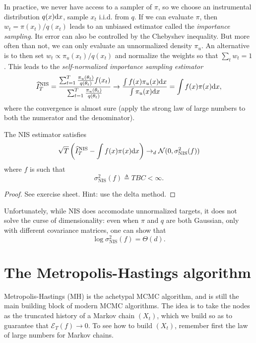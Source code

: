 In practice, we never have access to a sampler of $\pi$, so we choose an instrumental distribution $q(x)\mathrm{d} x$, sample $x_t$ i.i.d. from $q$.
If we can evaluate $\pi$, then $w_t=\pi(x_t)/q(x_t)$ leads to an unbiased estimator called the \emph{importance sampling}.
Its error can also be controlled by the Chebyshev inequality. 
But more often than not, we can only evaluate an unnormalized density $\pi_u$. 
An alternative is to then set $w_t\propto \pi_u(x_t)/q(x_t)$ and normalize the weights so that $\sum_t w_t=1$. 
This leads to the \emph{self-normalized importance sampling estimator}
$$
\widehat I_T^\text{NIS} = \frac{\sum_{t=1}^T \frac{\pi_u(\theta_t)}{q(\theta_t)} f(x_t)}{\sum_{t=1}^T \frac{\pi_u(\theta_t)}{q(\theta_t)}} \rightarrow \frac{\int f(x)\pi_u(x)\mathrm{d} x}{\int \pi_u(x)\mathrm{d} x} = \int f(x)\pi(x)\mathrm{d} x,
$$
where the convergence is almost sure (apply the strong law of large numbers to both the numerator and the denominator).
\begin{proposition} The NIS estimator satisfies
   $$
   \sqrt{T} \left (\widehat I_T^\text{NIS} - \int f(x)\pi(x)\mathrm{d} x\right ) \rightarrow_d \mathcal{N}(0,\sigma_{\text{NIS}}^2(f))
   $$
   where $f$ is such that
   $$
   \sigma_{\text{NIS}}^2(f) \triangleq TBC <\infty.
   $$
\end{proposition}
\begin{proof}
    See exercise sheet. Hint: use the delta method.
\end{proof}
Unfortunately, while NIS does accomodate unnormalized targets, it does not solve the curse of dimensionality: even when $\pi$ and $q$ are both Gaussian, only with different covariance matrices, one can show that 
$$
\log \sigma_{\text{NIS}}^2(f) = \Theta(d).
$$

\section{The Metropolis-Hastings algorithm}
Metropolis-Hastings (MH) is the achetypal MCMC algorithm, and is still the main building block of modern MCMC algorithms. 
The idea is to take the nodes as the truncated history of a Markov chain $(X_t)$, which we build so as to guarantee that $\mathcal{E}_T(f)\rightarrow 0$.
To see how to build $(X_t)$, remember first the law of large numbers for Markov chains. 

